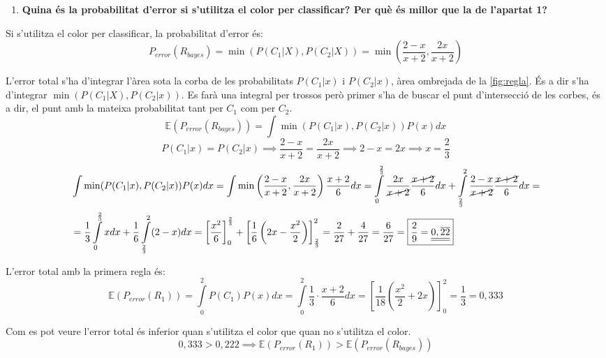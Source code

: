 \documentclass[a4paper]{article}
\begin{document}
\begin{enumerate}[resume]
	\item \textbf{Quina és la probabilitat d'error si s'utilitza el color per classificar? Per què és millor que la de l'apartat 1?}
\end{enumerate}

Si s'utilitza el color per classificar, la probabilitat d'error és:
$$
P_{error}(R_{bayes}) = \min(P(C_1|X),P(C_2|X)) = 
\boxed{\min\left(\frac{2 - x}{x + 2},\frac{2x}{x + 2}\right)}
$$

L'error total s'ha d'integrar l'àrea sota la corba de les probabilitats $P(C_1|x)$ i $P(C_2|x)$, àrea ombrejada de la \autoref{fig:regla}. És a dir s'ha d'integrar $\min(P(C_1|X),P(C_2|x))$. Es farà una integral per trossos però primer s'ha de buscar el punt d'intersecció de les corbes, és a dir, el punt amb la mateixa probabilitat tant per $C_1$ com per $C_2$.
$$
\mathbb{E}(P_{error}(R_{bayes})) = \int \min(P(C_1|x),P(C_2|x))P(x) dx
$$
$$
P(C_1|x) = P(C_2|x) \implies \frac{2 - x}{x + 2} = \frac{2x}{x + 2} \implies
2 - x = 2x \implies \boxed{x = \frac{2}{3}}
$$
\begin{align*}
& \int \min(P(C_1|x),P(C_2|x))P(x) dx = 
\int \min\left(\frac{2 - x}{x + 2},\frac{2x}{x + 2}\right)\frac{x+2}{6} dx =
\int\limits_{0}^{\frac{2}{3}} \frac{2x}{\cancel{x + 2}} \frac{\cancel{x+2}}{6} dx + 
\int\limits_{\frac{2}{3}}^{2} \frac{2 - x}{\cancel{x + 2}} \frac{\cancel{x+2}}{6} dx  = \\
& = \frac{1}{3} \int\limits_0^{\frac{2}{3}} x dx + \frac{1}{6} \int\limits_{\frac{2}{3}}^2 (2 - x) dx =
\left[\frac{x^2}{6}\right]_0^{\frac{2}{3}} + \left[\frac{1}{6} \left(2x - \frac{x^2}{2}\right)\right]_{\frac{2}{3}}^2 = \frac{2}{27} + \frac{4}{27} = \frac{6}{27} =
\boxed{\frac{2}{9} = \underline{\underline{0,\overline{22}}}}
\end{align*}

L'error total amb la primera regla és:
$$
\mathbb{E}(P_{error}(R_1)) = \int\limits_{0}^{2} P(C_1)P(x)dx = 
\int\limits_{0}^{2}\frac{1}{3}·\frac{x + 2}{6}dx =\left[ \frac{1}{18} \left( \frac{x^2}{2} + 2x \right)\right]_0^2= \boxed{\frac{1}{3} = 0,333}
$$

Com es pot veure l'error total és inferior quan s'utilitza el color que quan no s'utilitza el color.
$$
0,333 > 0,222 \implies 
\mathbb{E}(P_{error}(R_1)) > \mathbb{E}(P_{error}(R_{bayes}))
$$
\end{document}
